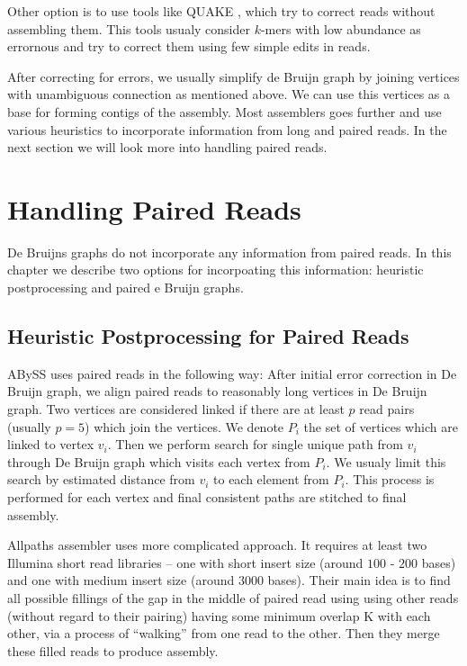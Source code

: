 \bigskip

Other option is to use tools like QUAKE \citep{Quake}, which try to correct reads
without assembling them. This tools usualy consider $k$-mers with low abundance
as errornous and try to correct them using few simple edits in reads.

After correcting for errors, we usually simplify de Bruijn graph by joining vertices
with unambiguous connection as mentioned above. 
We can use this vertices as a base for forming contigs of the assembly.
Most assemblers goes further and use various heuristics
to incorporate information from long and paired reads.
In the next section we will look more into handling paired reads.

\section{Handling Paired Reads}

De Bruijns graphs do not incorporate any information from paired reads.
In this chapter we describe two options for incorpoating this information:
heuristic postprocessing and paired e Bruijn graphs.

\subsection{Heuristic Postprocessing for Paired Reads}

ABySS \citep{Abyss} uses paired reads in the following way:
After initial error correction in De Bruijn graph, we align paired reads
to reasonably long vertices in De Bruijn graph. Two vertices are considered linked
if there are at least $p$ read pairs (usually $p=5$) which join the vertices.
We denote $P_i$ the set of vertices which are linked to vertex $v_i$.
Then we perform search for single unique path from $v_i$ through De Bruijn graph which visits
each vertex from $P_i$. We usualy limit this search by estimated distance from $v_i$ to each element
from $P_i$. This process is performed for each vertex and final consistent paths
are stitched to final assembly.

Allpaths assembler \citep{allpaths} uses more complicated approach.
It requires at least two Illumina short read libraries -- one with short insert size
(around $100$ - $200$ bases) and one with medium insert size (around $3000$ bases).
Their main idea is to find all possible fillings of the gap in the middle of paired read
using using other reads (without regard to their pairing)
having some minimum overlap K with each other, via a process of “walking” from
one read to the other. Then they merge these filled reads to produce assembly. 

